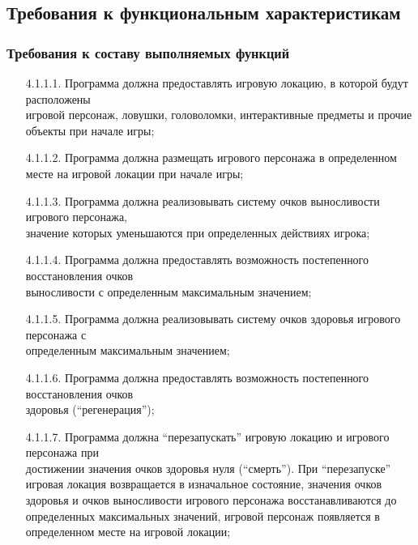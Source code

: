 \subsection{Требования к функциональным характеристикам}

\subsubsection{Требования к составу выполняемых функций}

\begin{enumerate}
    \item[4.1.1.1.] Программа должна предоставлять игровую локацию, в которой будут расположены\\
    игровой персонаж, ловушки, головоломки, интерактивные предметы и прочие объекты при начале игры;
    \item[4.1.1.2.] Программа должна размещать игрового персонажа в определенном месте на игровой локации при начале игры;
    \item[4.1.1.3.] Программа должна реализовывать систему очков выносливости игрового персонажа,\\
    значение которых уменьшаются при определенных действиях игрока;
    \item[4.1.1.4.] Программа должна предоставлять возможность постепенного восстановления очков\\
    выносливости с определенным максимальным значением;
    \item[4.1.1.5.] Программа должна реализовывать систему очков здоровья игрового персонажа с\\
    определенным максимальным значением;
    \item[4.1.1.6.] Программа должна предоставлять возможность постепенного восстановления очков\\
    здоровья (``регенерация'');
    \item[4.1.1.7.] Программа должна ``перезапускать'' игровую локацию и игрового персонажа при\\
    достижении значения очков здоровья нуля (``смерть''). При ``перезапуске'' игровая локация возвращается в изначальное состояние, значения очков здоровья и очков выносливости игрового персонажа восстанавливаются до определенных максимальных значений, игровой персонаж появляется в определенном месте на игровой локации;

\end{enumerate}
